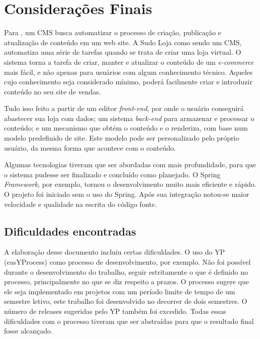 \documentclass[a4paper,12pt]{monografia}
\begin{document}
\chapter{Considerações Finais} %
\label{cha:considera_es_finais}

Para , um CMS busca automatizar o processo de criação, publicação e atualização de conteúdo em um web site. A Sudo Loja como sendo um CMS, automatiza uma série de tarefas quando se trata de criar uma loja virtual. O sistema torna a tarefa de criar, manter e atualizar o conteúdo de um \textit{e-commerce} mais fácil, e não apenas para usuários com algum conhecimento técnico. Aqueles cujo conhecimento seja considerado mínimo, poderá facilmente criar e introduzir conteúdo no seu site de vendas. 

Tudo isso feito a partir de um editor \textit{front-end}, por onde o usuário conseguirá abastecer sua loja com dados; um sistema \textit{back-end} para armazenar e processar o conteúdo; e um mecanismo que obtém o conteúdo e o renderiza, com base num modelo predefinido de site. Este modelo pode ser personalizado pelo próprio usuário, da mesma forma que acontece com o conteúdo.

Algumas tecnologias tiveram que ser abordadas com mais profundidade, para que o sistema pudesse ser finalizado e concluído como planejado. O Spring \textit{Framework}, por exemplo, tornou o desenvolvimento muito mais eficiente e rápido. O projeto foi iniciado sem o uso do Spring. Após sua integração notou-se maior velocidade e qualidade na escrita do código fonte.

\section{Dificuldades encontradas} %
\label{sec:dificuldades_encontradas}

A elaboração desse documento incluiu certas dificuldades. O uso do YP (easYProcess) como processo de desenvolvimento, por exemplo. Não foi possível durante o desenvolvimento do trabalho, seguir estritamente o que é definido no processo, principalmente no que se diz respeito a prazos. O processo sugere que ele seja implementado em projetos com um período limite de tempo de um semestre letivo, este trabalho foi desenvolvido no decorrer de dois semestres. O número de releases sugeridas pelo YP também foi excedido. Todas essas dificuldades com o processo tiveram que ser abstraídas para que o resultado final fosse alcançado.
\end{document}
